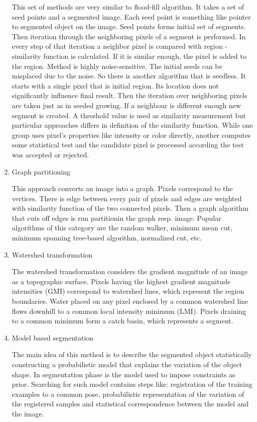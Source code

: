 \begin{enumerate}
  This set of methods are very similar to flood-fill algorithm.
It takes a set of seed points and a segmented image.
Each seed point is something like pointer to segmented object on the image.
Seed points forms initial set of segments.
Then iteration through the neighboring pixels of a segment is performed.
In every step of that iteration a neighbor pixel is compared with region - similarity function is calculated.
If it is similar enough, the pixel is added to the region.
  Method is highly noise-sensitive.
The initial seeds can be misplaced due to the noise.
So there is another algorithm that is seedless.
It starts with a single pixel that is initial region.
Its location does not significantly influence final result.
Then the iteration over neighboring pixels are taken just as in seeded growing.
If a neighbour is different enough new segment is created.
A threshold value is used as similarity measurement but particular approaches differs in definition of the similarity function.
While one group uses pixel's properties like intensity or color directly, another computes some statistical test and the candidate pixel is processed according the test was accepted or rejected.

  \item Graph partitioning

  This approach converts an image into a graph.
Pixels correspond to the vertices.
There is edge between every pair of pixels and edges are weighted with similarity function of the two connected pixels.
Then a graph algorithm that cuts off edges is run partitionin the graph resp. image.
Popular algorithms of this category are the random walker, minimum mean cut, minimum spanning tree-based algorithm, normalized cut, etc.

  \item Watershed transformation

  The watershed transformation considers the gradient magnitude of an image as a topographic surface.
Pixels having the highest gradient magnitude intensities (GMI) correspond to watershed lines, which represent the region boundaries.
Water placed on any pixel enclosed by a common watershed line flows downhill to a common local intensity minimum (LMI).
Pixels draining to a common minimum form a catch basin, which represents a segment.

  \item Model based segmentation

  The main idea of this method is to describe the segmented object statistically constructing a probabilistic model that explains the variation of the object shape.
In segmentation phase is the model used to impose constraints as prior.
Searching for such model contains steps like: registration of the training examples to a common pose, probabilistic representation of the variation of the registered samples and statistical correspondence between the model and the image.


\end{enumerate}
